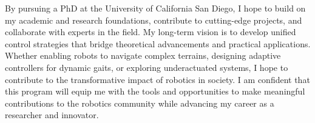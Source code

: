 \documentclass[10pt]{article}
\begin{document}
By pursuing a PhD at the University of California San Diego, I hope to build on my academic and research foundations, contribute to cutting-edge projects, and collaborate with experts in the field. My long-term vision is to develop unified control strategies that bridge theoretical advancements and practical applications. Whether enabling robots to navigate complex terrains, designing adaptive controllers for dynamic gaits, or exploring underactuated systems, I hope to contribute to the transformative impact of robotics in society. I am confident that this program will equip me with the tools and opportunities to make meaningful contributions to the robotics community while advancing my career as a researcher and innovator.   


\vfill
\end{document}
